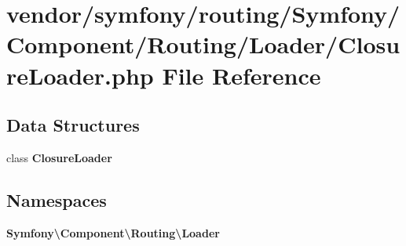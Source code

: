 \section{vendor/symfony/routing/\+Symfony/\+Component/\+Routing/\+Loader/\+Closure\+Loader.php File Reference}
\label{_closure_loader_8php}
\subsection*{Data Structures}
\begin{DoxyCompactItemize}
\item 
class {\bf Closure\+Loader}
\end{DoxyCompactItemize}
\subsection*{Namespaces}
\begin{DoxyCompactItemize}
\item 
 {\bf Symfony\textbackslash{}\+Component\textbackslash{}\+Routing\textbackslash{}\+Loader}
\end{DoxyCompactItemize}
